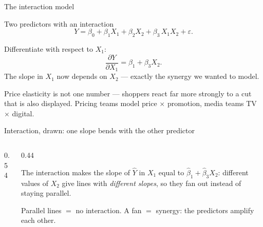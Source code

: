 \documentclass[aspectratio=169,11pt]{beamer}
\begin{document}
\begin{frame}{The interaction model}
  \begin{block}{Two predictors with an interaction}
    \[
      Y = \beta_0 + \beta_1 X_1 + \beta_2 X_2 + \beta_3\,X_1 X_2 + \varepsilon.
    \]
  \end{block}
  \begin{readme}
    Differentiate with respect to $X_1$:
    \[
      \frac{\partial Y}{\partial X_1} = \beta_1 + \beta_3 X_2.
    \]
    The slope in $X_1$ now depends on $X_2$ --- exactly the synergy we
    wanted to model.
  \end{readme}
  \begin{industry}
    Price elasticity is not one number --- shoppers react far more strongly
    to a cut that is also displayed. Pricing teams model
    price $\times$ promotion, media teams TV $\times$ digital.
  \end{industry}
\end{frame}

\begin{frame}{Interaction, drawn: one slope bends with the other predictor}
  \begin{columns}[T]
    \begin{column}{0.54\textwidth}
      \begin{center}
      \end{center}
    \end{column}
    \begin{column}{0.44\textwidth}
      \begin{readme}
        The interaction makes the slope of $\hat Y$ in $X_1$ equal to
        $\hat\beta_1+\hat\beta_3 X_2$: different values of $X_2$ give lines
        with \emph{different slopes}, so they fan out instead of staying
        parallel.
      \end{readme}
      \begin{takeaway}
        Parallel lines $=$ no interaction. A fan $=$ synergy: the
        predictors amplify each other.
      \end{takeaway}
    \end{column}
  \end{columns}
\end{frame}
\end{document}

